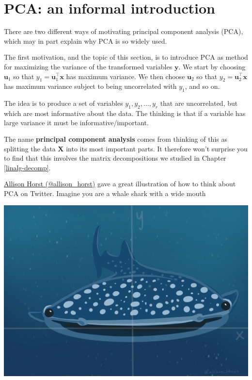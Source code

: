 \documentclass[
]{book}
\theoremstyle{definition}
\theoremstyle{definition}
\theoremstyle{definition}
\theoremstyle{definition}
\theoremstyle{remark}
\begin{document}
\hypertarget{pca-an-informal-introduction}{%
\section{PCA: an informal introduction}\label{pca-an-informal-introduction}}

There are two different ways of motivating
principal component analysis (PCA), which may in part explain why PCA is so widely used.

The first motivation, and the topic of this section, is to introduce PCA as method for maximizing the variance of the transformed variables \(\mathbf y\). We start by choosing \(\mathbf u_1\) so that \(y_1=\mathbf u_1^\top \mathbf x\) has maximum variance. We then choose \(\mathbf u_2\) so that \(y_2=\mathbf u_2^\top \mathbf x\) has maximum variance subject to being uncorrelated with \(y_1\), and so on.

The idea is to produce a set of variables \(y_1, y_2, \ldots, y_r\) that are uncorrelated, but which are most informative about the data. The thinking is that if a variable has large variance it must be informative/important.

The name \textbf{principal component analysis} comes from thinking of this as splitting the data \(\mathbf X\) into its most important parts. It therefore won't surprise you to find that this involves the matrix decompositions we studied in Chapter \ref{linalg-decomp}.

\href{https://twitter.com/allison_horst/status/1288904459490213888?lang=en}{Allison Horst (@allison\_horst)} gave a great illustration of how to think about PCA on Twitter. Imagine you are a whale shark with a wide mouth

\includegraphics{figs/WideMouthShark1.png}
\end{document}
